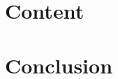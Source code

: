 \documentclass{beamer}
\begin{document}
\section{Content}
%    
%    
%    
%    
\section{Conclusion}
\end{document}
